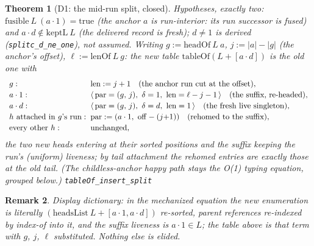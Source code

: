 \documentclass[11pt]{article}
\newtheorem{theorem}{Theorem}[section]
\newtheorem{remark}[theorem]{Remark}
\newcommand{\lean}[1]{\texttt{#1}}
\newcommand{\code}[1]{\texttt{#1}}
\begin{document}
\begin{theorem}[D1: the mid-run split, closed]
\label{thm:d1split}
Hypotheses, exactly two: $\mathrm{fusible}\ L\ (a \cdot 1) =
\mathrm{true}$ (the anchor $a$ is run-interior: its run successor is
fused) and $a \cdot d \notin \mathrm{keptL}\ L$ (the delivered record
is fresh); $d \neq 1$ is \emph{derived}
(\code{splitc\_d\_ne\_one}), not assumed. Writing $g :=
\mathrm{headOf}\ L\ a$, $j := |a| - |g|$ (the anchor's offset), $\ell
:= \mathrm{lenOf}\ L\ g$: the new table $\mathrm{tableOf}(L + [a
\cdot d])$ is the old one with
\[
  \begin{array}{l@{\;\;}l}
    g: & \mathrm{len} := j + 1 \quad (\text{the anchor run cut at the
         offset}),\\[2pt]
    a \cdot 1: & \langle\, \mathrm{par} = (g,\, j),\ \delta = 1,\
         \mathrm{len} = \ell - j - 1 \,\rangle \quad (\text{the suffix,
         re-headed}),\\[2pt]
    a \cdot d: & \langle\, \mathrm{par} = (g,\, j),\ \delta = d,\
         \mathrm{len} = 1 \,\rangle \quad (\text{the fresh live
         singleton}),\\[2pt]
    h \text{ attached in } g\text{'s run}: & \mathrm{par} :=
         (a \cdot 1,\ \mathrm{off} - (j{+}1)) \quad (\text{rehomed to
         the suffix}),\\[2pt]
    \text{every other } h: & \text{unchanged},
  \end{array}
\]
the two new heads entering at their sorted positions and the suffix
keeping the run's (uniform) liveness; by tail attachment the rehomed
entries are exactly those at the old tail. (The childless-anchor happy
path stays the O(1) typing equation, grouped below.)
\hfill\lean{tableOf\_insert\_split}
\end{theorem}

\begin{remark}
Display dictionary: in the mechanized equation the new enumeration is
literally $(\mathrm{headsList}\ L + [a \cdot 1, a \cdot d])$
re-sorted, parent references re-indexed by index-of into it, and the
suffix liveness is $a \cdot 1 \in L$; the table above is that term
with $g$, $j$, $\ell$ substituted. Nothing else is elided.
\end{remark}
\end{document}
